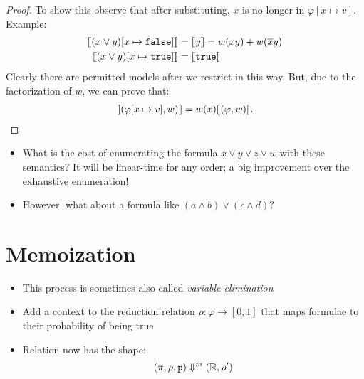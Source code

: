 \documentclass{tufte-handout}
\begin{document}
\begin{proof}
To show this observe that after substituting, $x$ is no longer in $\varphi[x \mapsto v]$. 
Example:
\begin{align*}
  \llbracket {(x \lor y)[x \mapsto \texttt{false}]} \rrbracket &= \llbracket {y} \rrbracket = w(xy) + w(\overline{x}y)\\ 
  \llbracket {(x \lor y)[x \mapsto \texttt{true}]} \rrbracket &= \llbracket {\texttt{true}} \rrbracket
\end{align*}
Clearly there are permitted models after we restrict in this way. But, due to the 
factorization of $w$, we can prove that:
\begin{align*}
  \llbracket {(\varphi[x \mapsto v], w)} \rrbracket = w(x)\llbracket {(\varphi, w)} \rrbracket.
\end{align*}

\end{proof}



\begin{itemize}
  \item What is the cost of enumerating the formula $x \lor y \lor z \lor w$ with these 
  semantics? It will be linear-time for any order; a big improvement over the 
  exhaustive enumeration!

  \item However, what about a formula like $(a \land b) \lor (c \land d)$?
\end{itemize}

\section{Memoization}

\begin{itemize}
  \item This process is sometimes also called \emph{variable elimination}
  \item Add a context to the reduction relation $\rho: \varphi \rightarrow [0,
  1]$ that maps formulae to their probability of being true
  \item Relation now has the shape:
  \begin{align*}
    (\pi, \rho, \texttt{p}) \Downarrow^m (\mathbb{R}, \rho')
  \end{align*}
\end{itemize}




\end{document}
